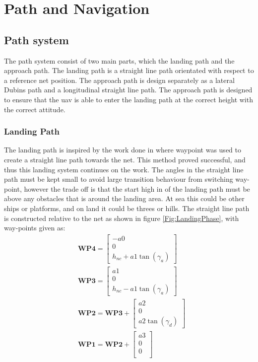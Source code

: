 \chapter{Path and Navigation}
\section{Path system}\label{Ch:LandingPath}
The path system consist of two main parts, which the landing path and the approach path. The landing path is a straight line path orientated with respect to a reference net position. The approach path is design separately as a lateral Dubins path and a longitudinal straight line path. The approach path is designed to ensure that the \gls{uav} is able to enter the landing path at the correct height with the correct attitude.
\subsection{Landing Path}\label{SS:netApproach}
The landing path is inspired by the work done in \citep{Skulstad&Syversen} where waypoint was used to create a straight line path towards the net. This method proved successful, and thus this landing system continues on the work. The angles in the straight line path must be kept small to avoid large transition behaviour from switching way-point, however the trade off is that the start high in of the landing path must be above any obstacles that is around the landing area. At sea this could be other ships or platforms, and on land it could be threes or hills. The straight line path is constructed relative to the net as shown in figure \ref{Fig:LandingPhase}, with way-points given as:
\begin{subequations}
\begin{align}
&\mathbf{WP4} = 
\begin{bmatrix}
-a0 \\
0 \\
h_{nc} + a1\tan(\gamma_a) 
\end{bmatrix}\\
&\mathbf{WP3} = 
\begin{bmatrix}
a1 \\
0 \\
h_{nc} - a1\tan(\gamma_a)
\end{bmatrix}\\
&\mathbf{WP2} = \mathbf{WP3} + 
\begin{bmatrix}
a2 \\
0 \\
a2\tan(\gamma_d)
\end{bmatrix}\\
&\mathbf{WP1} = \mathbf{WP2} + 
\begin{bmatrix}
a3 \\
0 \\
0 \\
\end{bmatrix}
\end{align}
\end{subequations}

